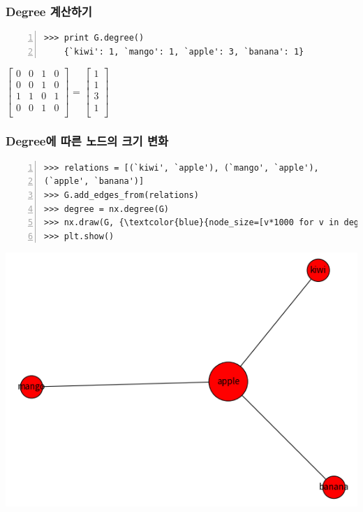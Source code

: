 \documentclass{beamer}
\begin{document}
\begin{frame}[fragile]
\frametitle{Degree 계산하기}
\begin{block}{}
	\begin{Verbatim}[numbers=left,commandchars=\\\{\}]
	>>> print G.degree()
	{`kiwi': 1, `mango': 1, `apple': 3, `banana': 1}
	\end{Verbatim}
\end{block}
\begin{center}
\(
  \begin{bmatrix}
    0 & 0 & 1 & 0\\
    0 & 0 & 1 & 0\\
    1 & 1 & 0 & 1\\
    0 & 0 & 1 & 0\\
  \end{bmatrix}
\)
=
\(
  \begin{bmatrix}
    1\\
    1\\
    3\\
    1\\
  \end{bmatrix}
\)
\end{center}
\end{frame}

\begin{frame}[fragile]
\frametitle{Degree에 따른 노드의 크기 변화}
\begin{block}{}
	\begin{Verbatim}[numbers=left,commandchars=\\\{\}]
>>> relations = [(`kiwi', `apple'), (`mango', `apple'),
(`apple', `banana')]
>>> G.add_edges_from(relations)
>>> degree = nx.degree(G)
>>> nx.draw(G, {\textcolor{blue}{node_size=[v*1000 for v in degree.values()]}})
>>> plt.show()
	\end{Verbatim}
\end{block}
\begin{center}
\includegraphics[scale=0.35]{nodesize.png}
\end{center}
\end{frame}
\end{document}
